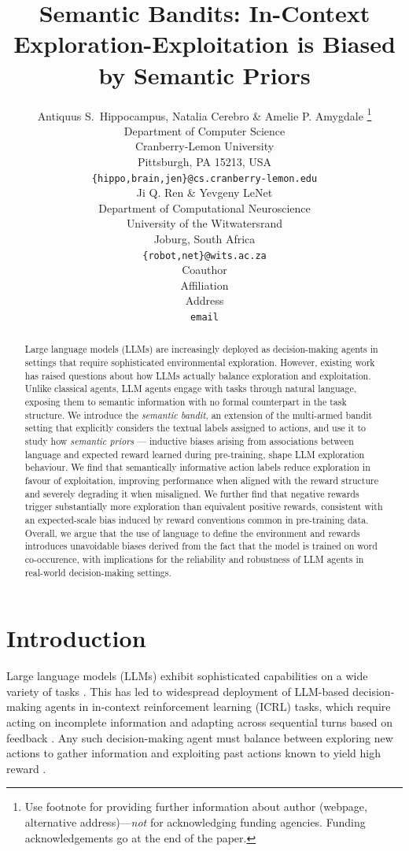\documentclass{article} %
\title{Semantic Bandits: In-Context Exploration-Exploitation is Biased by Semantic Priors}
\author{Antiquus S.~Hippocampus, Natalia Cerebro \& Amelie P. Amygdale \thanks{ Use footnote for providing further information
about author (webpage, alternative address)---\emph{not} for acknowledging
funding agencies.  Funding acknowledgements go at the end of the paper.} \\
Department of Computer Science\\
Cranberry-Lemon University\\
Pittsburgh, PA 15213, USA \\
\texttt{\{hippo,brain,jen\}@cs.cranberry-lemon.edu} \\
\And
Ji Q. Ren \& Yevgeny LeNet \\
Department of Computational Neuroscience \\
University of the Witwatersrand \\
Joburg, South Africa \\
\texttt{\{robot,net\}@wits.ac.za} \\
\AND
Coauthor \\
Affiliation \\
Address \\
\texttt{email}
}
\begin{document}
\ifcolmsubmission
\linenumbers
\fi

\maketitle


\begin{abstract}
Large language models (LLMs) are increasingly deployed as decision-making agents
in settings that require sophisticated environmental exploration. However, existing work has raised questions about how LLMs actually balance exploration and exploitation. Unlike classical agents, LLM agents engage with tasks through natural language, exposing them to semantic information with no formal counterpart in the task structure. We introduce the \textit{semantic bandit}, an extension of the multi-armed bandit setting that explicitly considers the textual labels assigned to actions, and use it to study how \textit{semantic priors} --- inductive biases arising from associations between language and expected reward learned during pre-training, shape LLM exploration behaviour. We find that semantically informative action labels reduce exploration in favour of exploitation, improving performance when aligned with the reward structure and severely degrading it when misaligned. We further find that negative rewards trigger substantially more exploration than equivalent positive rewards, consistent with an expected-scale bias induced by reward conventions common in pre-training data. Overall, we argue that the use of language to define the environment and rewards introduces unavoidable biases derived from the fact that the model is trained on word co-occurence, with implications for the reliability and robustness of LLM agents in real-world decision-making settings.
\end{abstract}

\section{Introduction}
Large language models (LLMs) exhibit sophisticated capabilities on a wide variety of tasks \citep{bubeck2023sparks, srivastava2023beyond}. This has led to widespread deployment of LLM-based decision-making agents in in-context reinforcement learning (ICRL) tasks, which require acting on incomplete information and adapting across sequential turns based on feedback \citep{reflexion, zhouWebArenaRealisticWeb2023, drouinWorkArenaHowCapable2024}. Any such decision-making agent must balance between exploring new actions to gather information and exploiting past actions known to yield high reward \citep{suttonReinforcementLearningIntroduction2020}.  
\end{document}
